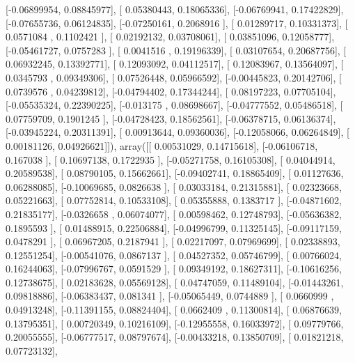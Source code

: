 \documentclass{article}
\begin{document}
       [-0.06899954,  0.08845977],
       [ 0.05380443,  0.18065336],
       [-0.06769941,  0.17422829],
       [-0.07655736,  0.06124835],
       [-0.07250161,  0.2068916 ],
       [ 0.01289717,  0.10331373],
       [ 0.0571084 ,  0.1102421 ],
       [ 0.02192132,  0.03708061],
       [ 0.03851096,  0.12058777],
       [-0.05461727,  0.0757283 ],
       [ 0.0041516 ,  0.19196339],
       [ 0.03107654,  0.20687756],
       [ 0.06932245,  0.13392771],
       [ 0.12093092,  0.04112517],
       [ 0.12083967,  0.13564097],
       [ 0.0345793 ,  0.09349306],
       [ 0.07526448,  0.05966592],
       [-0.00445823,  0.20142706],
       [ 0.0739576 ,  0.04239812],
       [-0.04794402,  0.17344244],
       [ 0.08197223,  0.07705104],
       [-0.05535324,  0.22390225],
       [-0.013175  ,  0.08698667],
       [-0.04777552,  0.05486518],
       [ 0.07759709,  0.1901245 ],
       [-0.04728423,  0.18562561],
       [-0.06378715,  0.06136374],
       [-0.03945224,  0.20311391],
       [ 0.00913644,  0.09360036],
       [-0.12058066,  0.06264849],
       [ 0.00181126,  0.04926621]]), array([[ 0.00531029,  0.14715618],
       [-0.06106718,  0.167038  ],
       [ 0.10697138,  0.1722935 ],
       [-0.05271758,  0.16105308],
       [ 0.04044914,  0.20589538],
       [ 0.08790105,  0.15662661],
       [-0.09402741,  0.18865409],
       [ 0.01127636,  0.06288085],
       [-0.10069685,  0.0826638 ],
       [ 0.03033184,  0.21315881],
       [ 0.02323668,  0.05221663],
       [ 0.07752814,  0.10533108],
       [ 0.05355888,  0.1383717 ],
       [-0.04871602,  0.21835177],
       [-0.0326658 ,  0.06074077],
       [ 0.00598462,  0.12748793],
       [-0.05636382,  0.1895593 ],
       [ 0.01488915,  0.22506884],
       [-0.04996799,  0.11325145],
       [-0.09117159,  0.0478291 ],
       [ 0.06967205,  0.2187941 ],
       [ 0.02217097,  0.07969699],
       [ 0.02338893,  0.12551254],
       [-0.00541076,  0.0867137 ],
       [ 0.04527352,  0.05746799],
       [ 0.00766024,  0.16244063],
       [-0.07996767,  0.0591529 ],
       [ 0.09349192,  0.18627311],
       [-0.10616256,  0.12738675],
       [ 0.02183628,  0.05569128],
       [ 0.04747059,  0.11489104],
       [-0.01443261,  0.09818886],
       [-0.06383437,  0.081341  ],
       [-0.05065449,  0.0744889 ],
       [ 0.0660999 ,  0.04913248],
       [-0.11391155,  0.08824404],
       [ 0.0662409 ,  0.11300814],
       [ 0.06876639,  0.13795351],
       [ 0.00720349,  0.10216109],
       [-0.12955558,  0.16033972],
       [ 0.09779766,  0.20055555],
       [-0.06777517,  0.08797674],
       [-0.00433218,  0.13850709],
       [ 0.01821218,  0.07723132],
\end{document}
